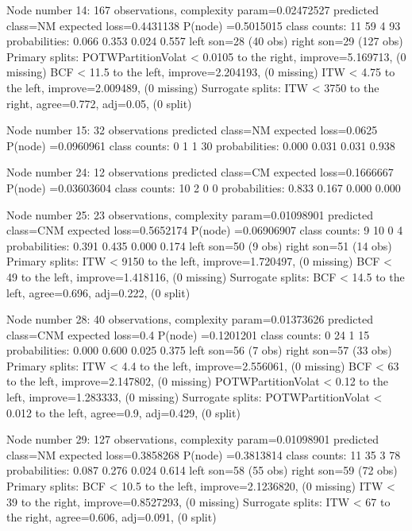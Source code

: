 \documentclass{article}
\begin{document}
\begin{Schunk}
\begin{Soutput}
Node number 14: 167 observations,    complexity param=0.02472527
  predicted class=NM   expected loss=0.4431138  P(node) =0.5015015
    class counts:    11    59     4    93
   probabilities: 0.066 0.353 0.024 0.557 
  left son=28 (40 obs) right son=29 (127 obs)
  Primary splits:
      POTWPartitionVolat < 0.0105 to the right, improve=5.169713, (0 missing)
      BCF                < 11.5   to the left,  improve=2.204193, (0 missing)
      ITW                < 4.75   to the left,  improve=2.009489, (0 missing)
  Surrogate splits:
      ITW < 3750   to the right, agree=0.772, adj=0.05, (0 split)

Node number 15: 32 observations
  predicted class=NM   expected loss=0.0625  P(node) =0.0960961
    class counts:     0     1     1    30
   probabilities: 0.000 0.031 0.031 0.938 

Node number 24: 12 observations
  predicted class=CM   expected loss=0.1666667  P(node) =0.03603604
    class counts:    10     2     0     0
   probabilities: 0.833 0.167 0.000 0.000 

Node number 25: 23 observations,    complexity param=0.01098901
  predicted class=CNM  expected loss=0.5652174  P(node) =0.06906907
    class counts:     9    10     0     4
   probabilities: 0.391 0.435 0.000 0.174 
  left son=50 (9 obs) right son=51 (14 obs)
  Primary splits:
      ITW < 9150   to the left,  improve=1.720497, (0 missing)
      BCF < 49     to the left,  improve=1.418116, (0 missing)
  Surrogate splits:
      BCF < 14.5   to the left,  agree=0.696, adj=0.222, (0 split)

Node number 28: 40 observations,    complexity param=0.01373626
  predicted class=CNM  expected loss=0.4  P(node) =0.1201201
    class counts:     0    24     1    15
   probabilities: 0.000 0.600 0.025 0.375 
  left son=56 (7 obs) right son=57 (33 obs)
  Primary splits:
      ITW                < 4.4    to the left,  improve=2.556061, (0 missing)
      BCF                < 63     to the left,  improve=2.147802, (0 missing)
      POTWPartitionVolat < 0.12   to the left,  improve=1.283333, (0 missing)
  Surrogate splits:
      POTWPartitionVolat < 0.012  to the left,  agree=0.9, adj=0.429, (0 split)

Node number 29: 127 observations,    complexity param=0.01098901
  predicted class=NM   expected loss=0.3858268  P(node) =0.3813814
    class counts:    11    35     3    78
   probabilities: 0.087 0.276 0.024 0.614 
  left son=58 (55 obs) right son=59 (72 obs)
  Primary splits:
      BCF < 10.5   to the left,  improve=2.1236820, (0 missing)
      ITW < 39     to the right, improve=0.8527293, (0 missing)
  Surrogate splits:
      ITW < 67     to the right, agree=0.606, adj=0.091, (0 split)


\end{Soutput}
\end{Schunk}
\end{document}

